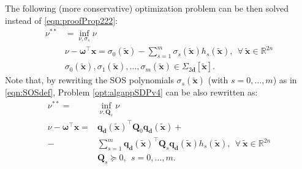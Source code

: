 \documentclass[twocolumn]{autart}
\newcommand{\DP}[1]{{#1}}
\newcommand{\xaug}{\tilde{\mathbf{x}}}
\newcommand{\relorder}{\DP{\mathbf{d}}}
\begin{document}
The following (more conservative) optimization problem can be then solved instead of  \eqref{eqn:proofProp222}:
  \begin{equation} \label{opt:algappSDPv4}
  \begin{split}
\nu^{**}&= \inf_{\nu,\sigma_s}  \nu\\
   & \nu - \boldsymbol{\omega}^\top  \mathbf{x}   = \sigma_0(\xaug)-\sum_{s=1}^m \sigma_s(\xaug) h_s(\xaug), ~~\forall~\xaug \in \mathbb{R}^{2n}\\
  & \sigma_0(\xaug), \sigma_1(\xaug), \ldots, \sigma_m(\xaug) \in \Sigma_{2\relorder}[\xaug].
  \end{split}
  \end{equation}
Note that, by rewriting the SOS polynomials $\sigma_s(\xaug)$ (with $s=0,\ldots,m$) as in \eqref{eqn:SOSdef}, Problem \eqref{opt:algappSDPv4} can be also rewritten as:
  \begin{equation} \label{opt:algappSDP}
  \begin{split}
\nu^{**}=& \inf_{\nu,\mathbf{Q}_s}  \nu\\
    \nu - \boldsymbol{\omega}^\top  \mathbf{x}   = & \mathbf{q}_\relorder(\xaug)^\top \mathbf{Q}_0 \mathbf{q}_\relorder(\xaug)+\\
   -& \sum_{s=1}^m \mathbf{q}_\relorder(\xaug)^\top \mathbf{Q}_s \mathbf{q}_\relorder(\xaug) h_s(\xaug), ~~\forall~\xaug \in \mathbb{R}^{2n}\\
  &\mathbf{Q}_s \succeq 0, \ \ s=0,\ldots,m.
  \end{split}
  \end{equation}
\end{document}
